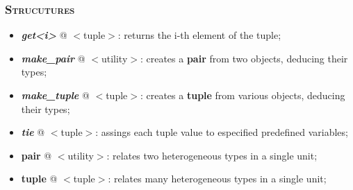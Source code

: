 \documentclass[10pt]{article}
\begin{document}
\begin{multicols*}{4}
{{\subsubsection*{\textsc{Strucutures}} 
\begin{itemize}[leftmargin=*,topsep=0.25pt]
  \setlength\itemsep{-1.8pt}
\item  \emph{{\textbf{get<i>}}} @ $<$tuple$>$: returns the i-th element of the tuple;  
\item  \emph{\textbf{make\_pair}} @ $<$utility$>$: creates a \textbf{pair} from two objects, deducing their types; 
\item  \emph{\textbf{make\_tuple}} @ $<$tuple$>$: creates a \textbf{tuple} from various objects, deducing their types; 
\item  \emph{\textbf{tie}} @ $<$tuple$>$: assings each tuple value to especified predefined variables; 
\item  {\textbf{pair}} @ $<$utility$>$: relates two heterogeneous types in a single unit; 
\item  {\textbf{tuple}} @ $<$tuple$>$: relates many heterogeneous types in a single unit;
\end{itemize}



}}
\end{multicols*}
\end{document}
